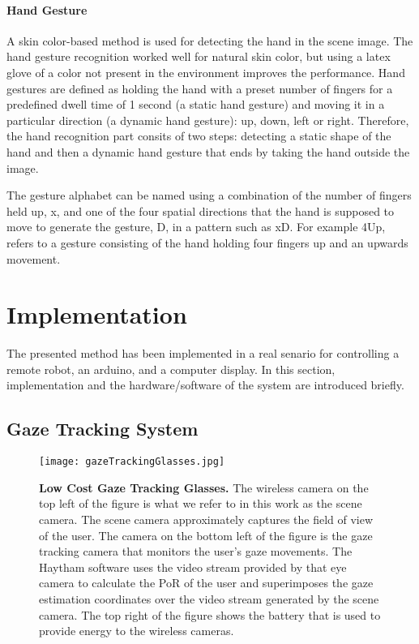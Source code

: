 \documentclass[jou,a4paper,notxfonts]{apa}
\begin{document}
\paragraph{Hand Gesture}
A skin color-based method is used for detecting the hand in the scene image. The hand gesture recognition worked well for natural skin color, but using a latex glove of a color not present in the environment improves the performance. Hand gestures are defined as holding the hand with a preset number of fingers for a predefined dwell time of 1 second (a static hand gesture) and moving it in a particular direction (a dynamic hand gesture): up, down, left  or right. Therefore, the hand recognition part consits of two steps: detecting a static shape of the hand and then a dynamic hand gesture that ends by taking the hand outside the image.
 
The gesture alphabet can be named using a combination of the number of fingers held up, x, and one of the four spatial directions that the hand is supposed to move to generate the gesture, D, in a pattern such as xD. For example 4Up, refers to a gesture consisting of the hand holding four fingers up and an upwards movement.

\section{Implementation}

The presented method has been implemented in a real senario for controlling a remote robot, an arduino, and a computer display. In this section, implementation and the hardware/software of the system are introduced briefly. 

\subsection{Gaze Tracking System}

\begin{figure}[tp]
 \texttt{[image: gazeTrackingGlasses.jpg]}
 \caption{\textbf{Low Cost Gaze Tracking Glasses.} The wireless camera on the top left of the figure is what we refer to in this work as the scene camera. The scene camera approximately captures the field of view of the user. The camera on the bottom left of the figure is the gaze tracking camera that monitors the user's gaze movements. The Haytham software uses the video stream provided by that eye camera to calculate the PoR of the user and superimposes the gaze estimation coordinates over the  video stream generated by the scene camera. The top right of the figure shows the battery that is used to provide energy to the wireless cameras.}
 \label{gazeTrackingGlasses}
\end{figure}
\end{document}
